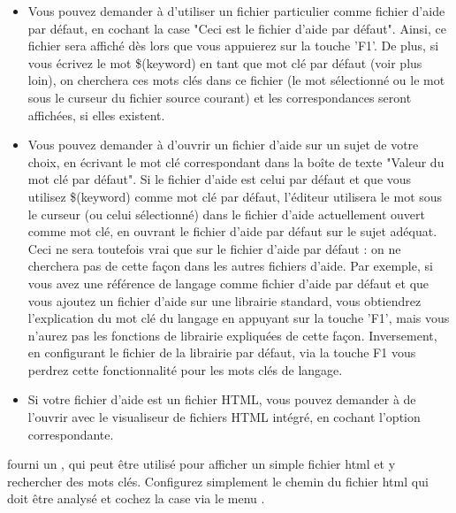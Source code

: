 \begin{itemize}
\item Vous pouvez demander à \codeblocks d'utiliser un fichier particulier comme fichier d'aide par défaut, en cochant la case "Ceci est le fichier d'aide par défaut". Ainsi, ce fichier sera affiché dès lors que vous appuierez sur la touche 'F1'. De plus, si vous écrivez le mot \$(keyword) en tant que mot clé par défaut (voir plus loin), on cherchera ces mots clés dans ce fichier (le mot sélectionné ou le mot sous le curseur du fichier source courant) et les correspondances seront affichées, si elles existent.

\item Vous pouvez demander à \codeblocks d'ouvrir un fichier d'aide sur un sujet de votre choix, en écrivant le mot clé correspondant dans la boîte de texte "Valeur du mot clé par défaut". Si le fichier d'aide est celui par défaut et que vous utilisez \$(keyword) comme mot clé par défaut, l'éditeur utilisera le mot sous le curseur (ou celui sélectionné) dans le fichier d'aide actuellement ouvert comme mot clé, en ouvrant le fichier d'aide par défaut sur le sujet adéquat. Ceci ne sera toutefois vrai que sur le fichier d'aide par défaut : on ne cherchera pas de cette façon dans les autres fichiers d'aide. Par exemple, si vous avez une référence de langage comme fichier d'aide par défaut et que vous ajoutez un fichier d'aide sur une librairie standard, vous obtiendrez l'explication du mot clé du langage en appuyant sur la touche 'F1', mais vous n'aurez pas les fonctions de librairie expliquées de cette façon. Inversement, en configurant le fichier de la librairie par défaut, via la touche F1 vous perdrez cette fonctionnalité pour les mots clés de langage.

\item Si votre fichier d'aide est un fichier HTML, vous pouvez demander à \codeblocks de l'ouvrir avec le visualiseur de fichiers HTML intégré, en cochant l'option correspondante.
\end{itemize}

\codeblocks fourni un , qui peut être utilisé pour afficher un simple fichier html et y rechercher des mots clés. Configurez simplement le chemin du fichier html qui doit être analysé et cochez la case   via le menu .


